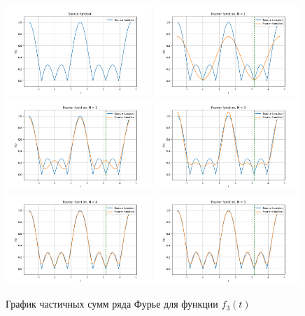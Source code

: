 \begin{figure}[ht!]
    \centering
    \includegraphics[width=0.49\textwidth]{media/plots/func_3_exp.png}
    \includegraphics[width=0.49\textwidth]{media/plots/func_3_N_1.png}
    \includegraphics[width=0.49\textwidth]{media/plots/func_3_N_2.png}
    \includegraphics[width=0.49\textwidth]{media/plots/func_3_N_3.png}
    \includegraphics[width=0.49\textwidth]{media/plots/func_3_N_4.png}
    \includegraphics[width=0.49\textwidth]{media/plots/func_3_N_5.png}
    \caption{График частичных сумм ряда Фурье для функции $f_3(t)$}
    \label{fig:func_3_plot}
\end{figure}

